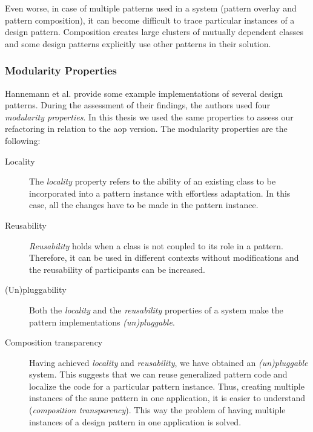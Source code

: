 Even worse, in case of multiple patterns used in a system (pattern overlay and pattern composition), it can become difficult to trace particular instances of a design pattern. 
Composition creates large clusters of mutually dependent classes\cite{sullivan2002advanced} and some design patterns explicitly use other patterns in their solution.

\subsubsection{Modularity Properties}\label{BG Modularity Properties}
Hannemann et al. \cite{hannemann2002design} provide some example implementations of several design patterns.
During the assessment of their findings, the authors used four \textit{modularity properties}.
In this thesis we used the same properties to assess our refactoring in relation to the \ac{aop} version.
The modularity properties are the following:

\begin{description}
	\item [Locality]
	The \textit{locality} property refers to the ability of an existing class to be incorporated into a pattern instance with effortless adaptation. 
	In this case, all the changes have to be made in the pattern instance.

	\item [Reusability]
	\textit{Reusability} holds when a class is not coupled to its role in a pattern.
	Therefore, it can be used in different contexts without modifications and the reusability of participants can be increased.

	\item [(Un)pluggability]
	Both the \textit{locality} and the \textit{reusability} properties of a system make the pattern implementations \textit{(un)pluggable}.

	\item [Composition transparency]
	Having achieved \textit{locality} and \textit{reusability}, we have obtained an \textit{(un)pluggable} system.
	This suggests that we can reuse generalized pattern code and localize the code for a particular pattern instance.
	Thus, creating multiple instances of the same pattern in one application, it is easier to understand (\textit{composition transparency}).
	This way the problem of having multiple instances of a design pattern in one application is solved.
\end{description}


